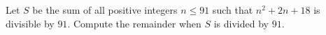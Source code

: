 Let $S$ be the sum of all positive integers $n \le 91$ such that $n^2 + 2n + 18$ is divisible by $91$. Compute the remainder when $S$ is divided by $91$.
